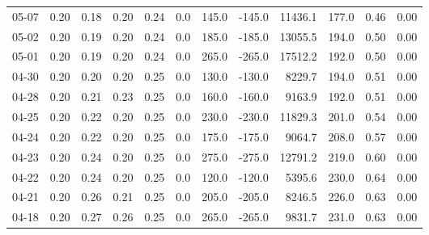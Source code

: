 \begin{threeparttable}
{\begin{tabular}{lrrrrrrrrrrr}
  05-07 &          0.20 &          0.18 &          0.20 &        0.24 &                 0.0 &               145.0 &     -145.0 &             11436.1 &            177.0 &            0.46 &                   0.00 \\
  05-02 &          0.20 &          0.19 &          0.20 &        0.24 &                 0.0 &               185.0 &     -185.0 &             13055.5 &            194.0 &            0.50 &                   0.00 \\
  05-01 &          0.20 &          0.19 &          0.20 &        0.24 &                 0.0 &               265.0 &     -265.0 &             17512.2 &            192.0 &            0.50 &                   0.00 \\
  04-30 &          0.20 &          0.20 &          0.20 &        0.25 &                 0.0 &               130.0 &     -130.0 &              8229.7 &            194.0 &            0.51 &                   0.00 \\
  04-28 &          0.20 &          0.21 &          0.23 &        0.25 &                 0.0 &               160.0 &     -160.0 &              9163.9 &            192.0 &            0.51 &                   0.00 \\
  04-25 &          0.20 &          0.22 &          0.20 &        0.25 &                 0.0 &               230.0 &     -230.0 &             11829.3 &            201.0 &            0.54 &                   0.00 \\
  04-24 &          0.20 &          0.22 &          0.20 &        0.25 &                 0.0 &               175.0 &     -175.0 &              9064.7 &            208.0 &            0.57 &                   0.00 \\
  04-23 &          0.20 &          0.24 &          0.20 &        0.25 &                 0.0 &               275.0 &     -275.0 &             12791.2 &            219.0 &            0.60 &                   0.00 \\
  04-22 &          0.20 &          0.24 &          0.20 &        0.25 &                 0.0 &               120.0 &     -120.0 &              5395.6 &            230.0 &            0.64 &                   0.00 \\
  04-21 &          0.20 &          0.26 &          0.21 &        0.25 &                 0.0 &               205.0 &     -205.0 &              8246.5 &            226.0 &            0.63 &                   0.00 \\
  04-18 &          0.20 &          0.27 &          0.26 &        0.25 &                 0.0 &               265.0 &     -265.0 &              9831.7 &            231.0 &            0.63 &                   0.00 \\

\end{tabular}}
\end{threeparttable}
